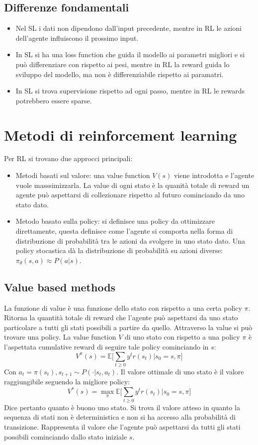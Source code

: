 	\subsection{Differenze fondamentali}
	\begin{itemize}
		\item Nel SL i dati non dipendono dall'input precedente, mentre in RL le azioni dell'agente influiscono il prossimo input.
		\item In SL si ha una loss function che guida il modello ai parametri migliori e si pu\`o differenziare con rispetto ai pesi, mentre in RL la reward guida lo sviluppo del modello, ma non \`e differenziabile rispetto ai paramatri.
		\item In SL si trova supervisione rispetto ad ogni passo, mentre in RL le rewards potrebbero essere sparse.
	\end{itemize}

\section{Metodi di reinforcement learning}
Per RL si trovano due approcci principali:
\begin{itemize}
	\item Metodi basati sul valore: una value function $V(s)$ viene introdotta e l'agente vuole masssimizzarla.
	La value di ogni stato \`e la quanit\`a totale di reward un agente pu\`o aspettarsi di collezionare rispetto al futuro cominciando da uno stato dato.
	\item Metodo basato sulla policy: si definisce una policy da ottimizzare direttamente, questa definisce come l'agente si comporta nella forma di distribuzione di probabilit\`a tra le azioni da svolgere in uno stato dato.
	Una policy stocastica d\`a la distribuzione di probabilit\`a su azioni diverse: $\pi_\theta(s,a)\approx P(a|s)$.
	
\end{itemize}

	\subsection{Value based methods}
	La funzione di value \`e una funzione dello stato con rispetto a una certa policy $\pi$.
	Ritorna la quantit\`a totale di reward che l'agente pu\`o aspettarsi da uno stato particolare a tutti gli stati possibili a partire da quello.
	Attraverso la value si pu\`o trovare una policy.
	La value function $V$ di uno stato con rispetto a una policy $\pi$ \`e l'aspettata cumulative reward di seguire tale policy cominciando in $s$:
	$$V^\pi(s) = \mathbb{E}\biggl[\sum\limits_{t\ge 0} y^tr(s_t)|s_0 = s,\pi\biggr]$$
	Con $a_t = \pi(s_t), s_{t+1}\sim P(\cdot|s_t, a_t)$.
	Il valore ottimale di uno stato \`e il valore raggiungibile seguendo la migliore policy:
	$$V^*(s) = \max_\pi\mathbb{E}\biggl[\sum\limits_{t\ge 0} y^tr(s_t)|s_0 = s,\pi\biggr]$$
	Dice pertanto quanto \`e buono uno stato.
	Si trova il valore atteso in quanto la sequenza di stati non \`e deterministica e non si ha accesso alla probabilit\`a di transizione.
	Rappresenta il valore che l'agente pu\`o aspettarsi da tutti gli stati possibili cominciando dallo stato iniziale $s$.

